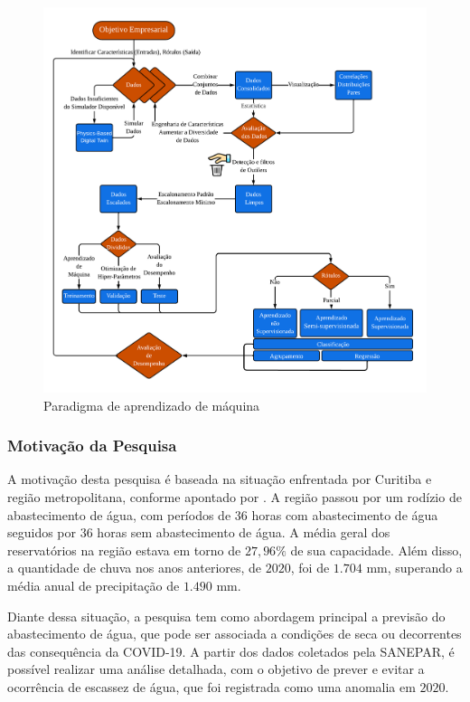 \begin{figure}[H]
	\centering
	\caption{Paradigma de aprendizado de máquina}
	\includegraphics[width=\linewidth]{Introducao/Figuras/paradigma-ml}
	
	\label{fig:paradigma-ml}
\end{figure}
  
      
\subsubsection{Motiva\c c\~ao da Pesquisa} \label{subsubsec:motivacao}
 
 
A motivação desta pesquisa é baseada na situação enfrentada por Curitiba e região metropolitana, conforme apontado por \cite{vasconcelos_2020}. A região passou por um rodízio de abastecimento de água, com períodos de 36 horas com abastecimento de água seguidos por 36 horas sem abastecimento de água. A média geral dos reservatórios na região estava em torno de $27,96\%$ de sua capacidade. Além disso, a quantidade de chuva nos anos anteriores, de $2020$, foi de $1.704$ mm, superando a média anual de precipitação de $1.490$ mm.
 	
Diante dessa situação, a pesquisa tem como abordagem principal a previsão do abastecimento de água, que pode ser associada a condições de seca ou decorrentes das consequência da COVID-19. A partir dos dados coletados pela SANEPAR, é possível realizar uma análise detalhada, com o objetivo de prever e evitar a ocorrência de escassez de água, que foi registrada como uma anomalia em $2020$. 
    
     
    